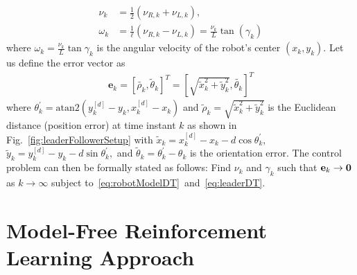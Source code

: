 \documentclass[conference]{IEEEtran}
\begin{document}
 \begin{subequations}
   \begin{align}
     \nu_{k} &= \frac{1}{2}(\nu_{R,k} + \nu_{L,k}),\\
     \omega_{k} &= \frac{1}{\ell}(\nu_{R,k} - \nu_{L,k}) = \frac{\nu_{k}}{L}\tan(\gamma_k) 	
   \end{align}
 \label{eq:robotModel1-DT}
 \end{subequations}
 where $\omega_k = \frac{\nu_k}{L}\tan\gamma_k$ is the angular velocity of the robot's center $(x_k,y_k).$ Let us define the error vector as 
 \begin{align}
     \label{eq:stateError}
   \mathbf{e}_k = \left[ \tilde{\rho_k},\tilde\theta_k \right]^T=\left[ \sqrt{\tilde{x}_k^2+\tilde{y}_k^2},\tilde{\theta_k} \right]^T%
 \end{align}
% 
 where $\theta_k^{'} = \mathrm{atan2}\left(y_k^{[d]}-y_k, x_k^{[d]}-x_k\right)$
 and $\tilde{\rho}_k =\sqrt{\tilde{x}_k^2+\tilde{y}_k^2} $ is the Euclidean distance (position error) at time instant $k$ as shown in Fig.~\ref{fig:leaderFollowerSetup} with $\tilde{x}_k = x_k^{[d]} - x_k - d\cos\theta_k^{'},$ $\tilde{y}_k = y_k^{[d]} - y_k - d\sin\theta_k^{'},$ and $\tilde{\theta}_k = \theta_k^{'} - \theta_k$ is the orientation error.  The control problem can then be formally stated as follows: Find $\nu_k$ and $\gamma_k$ such that ${\bf e}_k\to {\bf 0}$ as  $k\to\infty$ subject to~\eqref{eq:robotModelDT}~and~\eqref{eq:leaderDT}.

%
%




\section{Model-Free Reinforcement Learning Approach}
 \label{sec:RLSolution}
\end{document}
